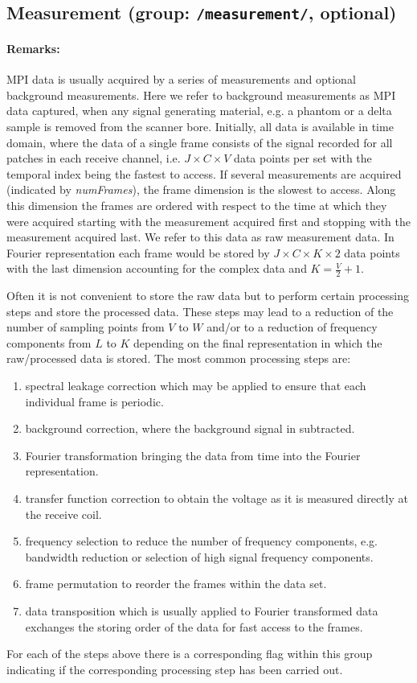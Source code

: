 \documentclass[landscape,a4paper]{article} %
\newcommand{\inl}[1]{\lstinline[columns=fixed]{#1}}
\begin{document}
\subsection{Measurement (group: \inl{/measurement/}, optional)}
\begin{multicols}{2}

\paragraph{Remarks:}
MPI data is usually acquired by a series of measurements and optional background measurements. Here we refer to background measurements as MPI data captured, when any signal generating material, e.g. a phantom or a delta sample is removed from the scanner bore. Initially, all data is available in time domain, where the data of a single frame consists of the signal recorded for all patches in each receive channel, i.e. $J \times C \times V$ data points per set with the temporal index being the fastest to access.  If several measurements are acquired (indicated by \textit{numFrames}), the frame dimension is the slowest to access. Along this dimension the frames are ordered with respect to the time at which they were acquired starting with the measurement acquired first and stopping with the measurement acquired last. We refer to this data as raw measurement data. In Fourier representation each frame would be stored by $J \times C\times K \times 2$ data points with the last dimension accounting for the complex data and $K = \frac V 2 +1$.

Often it is not convenient to store the raw data but to perform certain processing steps and store the processed data. These steps may lead to a reduction of the number of sampling points from $V$ to $W$ and/or to a reduction of frequency components from $L$ to $K$ depending on the final representation in which the raw/processed data is stored. The most common processing steps are:
\begin{enumerate}
	\item spectral leakage correction which may be applied to ensure that each individual frame is periodic.
	\item background correction, where the background signal in subtracted.
	\item Fourier transformation bringing the data from time into the Fourier representation.
	\item transfer function correction to obtain the voltage as it is measured directly at the receive coil.
	\item frequency selection to reduce the number of frequency components, e.g. bandwidth reduction or selection of high signal frequency components.
	\item frame permutation to reorder the frames within the data set.
	\item data transposition which is usually applied to Fourier transformed data exchanges the storing order of the data for fast access to the frames.
\end{enumerate}
For each of the steps above there is a corresponding flag within this group indicating if the corresponding processing step has been carried out. 


\end{multicols}
\end{document}
